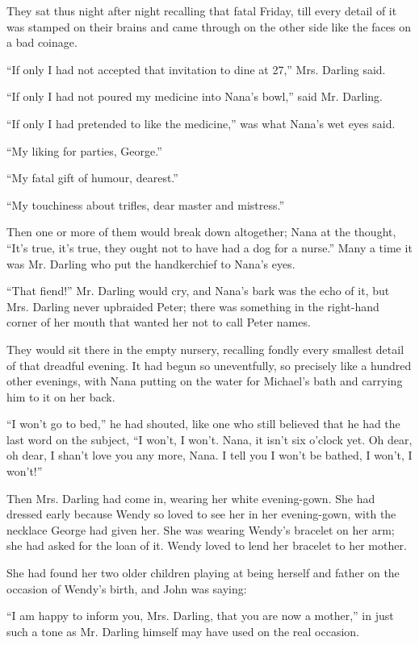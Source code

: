 They sat thus night after night recalling that fatal Friday, till every detail
of it was stamped on their brains and came through on the other side like the
faces on a bad coinage.

``If only I had not accepted that invitation to dine at 27,'' Mrs. Darling said.

``If only I had not poured my medicine into Nana's bowl,'' said Mr. Darling.

``If only I had pretended to like the medicine,'' was what Nana's wet eyes said.

``My liking for parties, George.''

``My fatal gift of humour, dearest.''

``My touchiness about trifles, dear master and mistress.''

Then one or more of them would break down altogether; Nana at the thought,
``It's true, it's true, they ought not to have had a dog for a nurse.''
Many a time it was Mr. Darling who put the handkerchief to Nana's eyes.

``That fiend!'' Mr. Darling would cry, and Nana's bark was the echo of it, but
Mrs. Darling never upbraided Peter; there was something in the right-hand corner
of her mouth that wanted her not to call Peter names.

They would sit there in the empty nursery, recalling fondly every smallest
detail of that dreadful evening. It had begun so uneventfully, so precisely like
a hundred other evenings, with Nana putting on the water for Michael's bath and
carrying him to it on her back.

``I won't go to bed,'' he had shouted, like one who still believed that he had
the last word on the subject, ``I won't, I won't.
Nana, it isn't six o'clock yet.
Oh dear, oh dear, I shan't love you any more, Nana.
I tell you I won't be bathed, I won't, I won't!''

Then Mrs. Darling had come in, wearing her white evening-gown.
She had dressed early because Wendy so loved to see her in her evening-gown,
with the necklace George had given her.
She was wearing Wendy's bracelet on her arm; she had asked for the loan of it.
Wendy loved to lend her bracelet to her mother.

She had found her two older children playing at being herself and father on the
occasion of Wendy's birth, and John was saying:

``I am happy to inform you, Mrs. Darling, that you are now a mother,'' in just
such a tone as Mr. Darling himself may have used on the real occasion.

